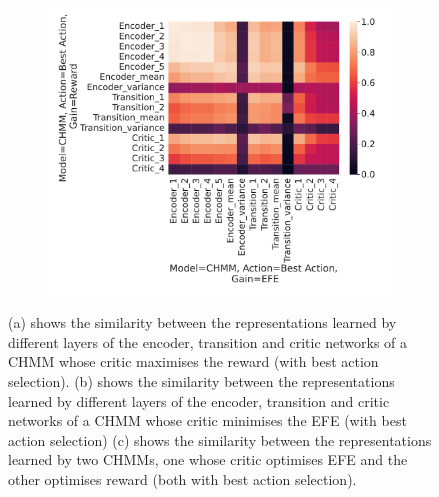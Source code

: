 \documentclass[twoside,11pt]{article}
\begin{document}
\begin{figure}[H]
\begin{subfigure}{.3\textwidth}
        \caption{}\label{sfig:cka-chmm2-chmm2-ba}
    \end{subfigure}%
    \begin{subfigure}{.3\textwidth}
        \centering
        \includegraphics[draft=false,width=\linewidth]{cka_figures/CKA_chmm_127_chmm_131}
        \caption{}\label{sfig:cka-chmm-chmm2-ba}
    \end{subfigure}

    \caption{(a) shows the similarity between the representations learned by different layers of the encoder, transition and critic networks of a CHMM whose critic maximises the reward (with best action selection).
        (b) shows the similarity between the representations learned by different layers of the encoder, transition and critic networks of a CHMM whose critic minimises the EFE (with best action selection)
        (c) shows the similarity between the representations learned by two CHMMs, one whose critic optimises EFE and the other optimises reward (both with best action selection).
    }
    \label{fig:cka-chmm-ba}
\end{figure}
\end{document}
